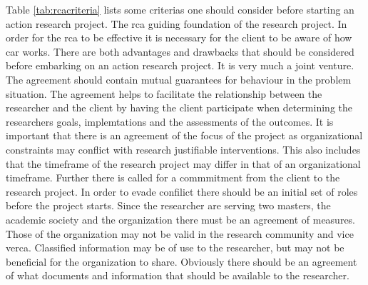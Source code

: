 Table \ref{tab:rcacriteria} lists some criterias one should consider before starting an action research project.
The \gls{rca} guiding foundation of the research project. In order for the \gls{rca} to be effective it is necessary for the client to be aware of how \gls{car} works. There are both advantages and drawbacks that should be considered before embarking on an action research project. 
It is very much a joint venture. 
The agreement should contain mutual guarantees for behaviour in the problem situation. 
The agreement helps to facilitate the relationship between the researcher and the client by having the client participate when determining the researchers goals, implemtations and the assessments of the outcomes.
It is important that there is an agreement of the focus of the project as organizational constraints may conflict with research justifiable interventions. This also includes that the timeframe of the research project may differ in that of an organizational timeframe. 
Further there is called for a commmitment from the client to the research project. In order to evade confilict there should be an initial set of roles before the project starts. Since the researcher are serving two masters, the academic society and the organization there must be an agreement of measures. Those of the organization may not be valid in the research community and vice verca.
Classified information may be of use to the researcher, but may not be beneficial for the organization to share. Obviously there should be an agreement of what documents and information that should be available to the researcher.

